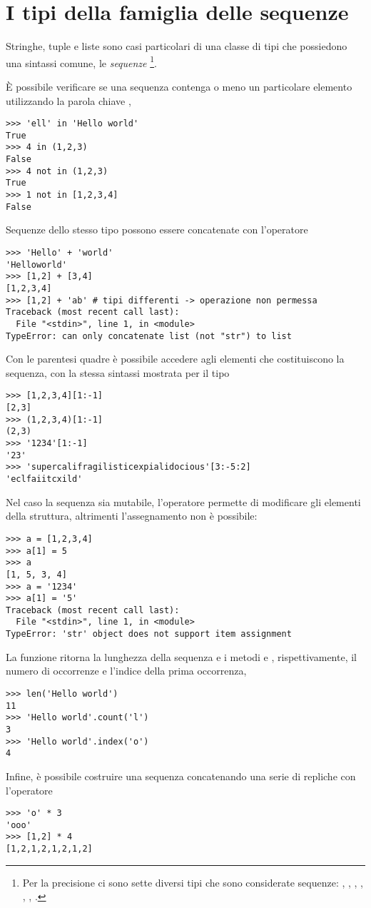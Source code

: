 \section{I tipi della famiglia delle sequenze}

Stringhe, tuple e liste sono casi particolari di una classe di tipi
che possiedono una sintassi comune, le \emph{sequenze}
\footnote{Per la precisione ci sono sette diversi tipi che sono
considerate sequenze: , , ,
, , , .}.

\`E possibile verificare se una sequenza contenga o meno un
particolare elemento utilizzando la parola chiave ,
\begin{verbatim}
>>> 'ell' in 'Hello world'
True
>>> 4 in (1,2,3)
False
>>> 4 not in (1,2,3)
True
>>> 1 not in [1,2,3,4]
False
\end{verbatim}
Sequenze dello stesso tipo possono essere concatenate con l'operatore
\istr{+}
\begin{verbatim}
>>> 'Hello' + 'world'
'Helloworld'
>>> [1,2] + [3,4]
[1,2,3,4]
>>> [1,2] + 'ab' # tipi differenti -> operazione non permessa
Traceback (most recent call last):
  File "<stdin>", line 1, in <module>
TypeError: can only concatenate list (not "str") to list
\end{verbatim}
Con le parentesi quadre \`e possibile accedere agli elementi che
costituiscono la sequenza, con la stessa sintassi mostrata per il
tipo 
\begin{verbatim}
>>> [1,2,3,4][1:-1]
[2,3]
>>> (1,2,3,4)[1:-1]
(2,3)
>>> '1234'[1:-1]
'23'
>>> 'supercalifragilisticexpialidocious'[3:-5:2]
'eclfaiitcxild'
\end{verbatim}
Nel caso la sequenza sia mutabile, l'operatore \istr{[]} permette di
modificare gli elementi della struttura, altrimenti l'assegnamento non
\`e possibile:
\begin{verbatim}
>>> a = [1,2,3,4]
>>> a[1] = 5
>>> a
[1, 5, 3, 4]
>>> a = '1234'
>>> a[1] = '5'
Traceback (most recent call last):
  File "<stdin>", line 1, in <module>
TypeError: 'str' object does not support item assignment
\end{verbatim}
La funzione  ritorna la lunghezza della sequenza e i metodi
 e , rispettivamente, il numero di occorrenze
e l'indice della prima occorrenza,
\begin{verbatim}
>>> len('Hello world')
11
>>> 'Hello world'.count('l')
3
>>> 'Hello world'.index('o')
4
\end{verbatim}
Infine, \`e possibile costruire una sequenza concatenando una
serie di repliche con l'operatore \istr{*}
\begin{verbatim}
>>> 'o' * 3
'ooo'
>>> [1,2] * 4
[1,2,1,2,1,2,1,2]
\end{verbatim}

